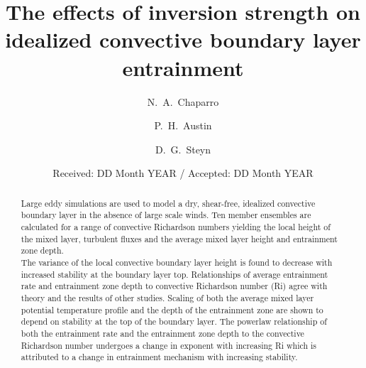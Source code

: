 \documentclass[referee]{svjour3}
\begin{document}
\graphicspath{{./figures/}}


\title{The effects of inversion strength  on idealized convective boundary layer entrainment%
}


\author{N.~A.~Chaparro \and P.~H.~Austin \and D.~G.~Steyn
}



\date{Received: DD Month YEAR / Accepted: DD Month YEAR}


\maketitle

\begin{abstract}

Large eddy simulations are used to  model a dry, shear-free, idealized convective boundary layer in the absence of large scale winds.  Ten member ensembles are calculated for a range of convective  Richardson numbers yielding the local height of the mixed layer, turbulent fluxes  and the average mixed layer height and entrainment zone depth. \\

The variance of the local convective boundary layer height is found to decrease with increased stability at the boundary layer top.  Relationships of average entrainment rate and entrainment zone depth to convective Richardson number (Ri) agree with theory and the results of other studies.  Scaling of both the average mixed layer potential temperature profile and the depth of the entrainment zone are shown to depend on stability at the top of the boundary layer.   The  powerlaw relationship of both the entrainment rate and the entrainment zone depth to the convective Richardson number undergoes  a change in exponent with increasing Ri which is attributed to a change in entrainment mechanism with increasing stability.

\end{abstract}
\end{document}
